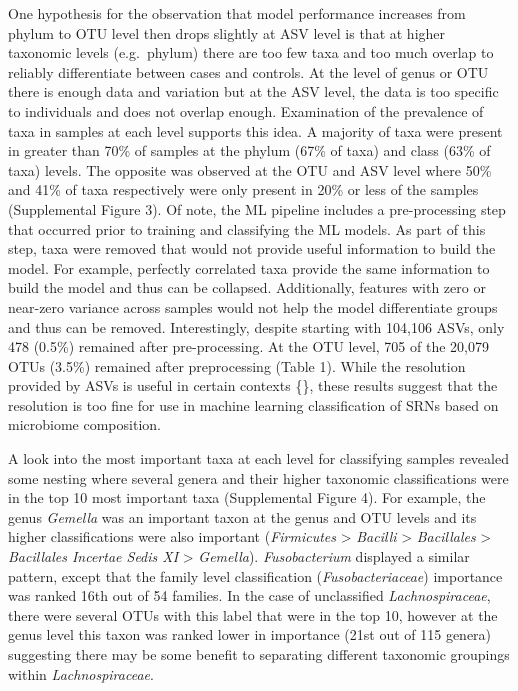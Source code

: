 \documentclass[]{article}
\begin{document}
One hypothesis for the observation that model performance increases from
phylum to OTU level then drops slightly at ASV level is that at higher
taxonomic levels (e.g.~phylum) there are too few taxa and too much
overlap to reliably differentiate between cases and controls. At the
level of genus or OTU there is enough data and variation but at the ASV
level, the data is too specific to individuals and does not overlap
enough. Examination of the prevalence of taxa in samples at each level
supports this idea. A majority of taxa were present in greater than 70\%
of samples at the phylum (67\% of taxa) and class (63\% of taxa) levels.
The opposite was observed at the OTU and ASV level where 50\% and 41\%
of taxa respectively were only present in 20\% or less of the samples
(Supplemental Figure 3). Of note, the ML pipeline includes a
pre-processing step that occurred prior to training and classifying the
ML models. As part of this step, taxa were removed that would not
provide useful information to build the model. For example, perfectly
correlated taxa provide the same information to build the model and thus
can be collapsed. Additionally, features with zero or near-zero variance
across samples would not help the model differentiate groups and thus
can be removed. Interestingly, despite starting with 104,106 ASVs, only
478 (0.5\%) remained after pre-processing. At the OTU level, 705 of the
20,079 OTUs (3.5\%) remained after preprocessing (Table 1). While the
resolution provided by ASVs is useful in certain contexts \{\}, these
results suggest that the resolution is too fine for use in machine
learning classification of SRNs based on microbiome composition.

A look into the most important taxa at each level for classifying
samples revealed some nesting where several genera and their higher
taxonomic classifications were in the top 10 most important taxa
(Supplemental Figure 4). For example, the genus \emph{Gemella} was an
important taxon at the genus and OTU levels and its higher
classifications were also important (\emph{Firmicutes} \textgreater{}
\emph{Bacilli} \textgreater{} \emph{Bacillales} \textgreater{}
\emph{Bacillales Incertae Sedis XI} \textgreater{} \emph{Gemella}).
\emph{Fusobacterium} displayed a similar pattern, except that the family
level classification (\emph{Fusobacteriaceae}) importance was ranked
16th out of 54 families. In the case of unclassified
\emph{Lachnospiraceae}, there were several OTUs with this label that
were in the top 10, however at the genus level this taxon was ranked
lower in importance (21st out of 115 genera) suggesting there may be
some benefit to separating different taxonomic groupings within
\emph{Lachnospiraceae}.
\end{document}
